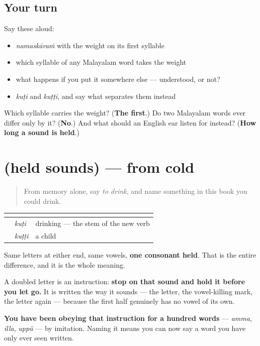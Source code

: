 \subsection*{Your turn}
Say these aloud:

\begin{itemize}
\raggedright
  \item \emph{namaskāraṁ} with the weight on its first syllable
  \item which syllable of any Malayalam word takes the weight
  \item what happens if you put it somewhere else — understood, or not?
  \item \emph{kuṭi} and \emph{kuṭṭi}, and say what separates them instead
\end{itemize}

\begin{tcolorbox}[breakable,colback=teal!4,colframe=teal!35!black,title={Before you move on}]
Which syllable carries the weight? (\textbf{The first}.) Do two Malayalam words ever differ only by it? (\textbf{No}.) And what should an English ear listen for instead? (\textbf{How long a sound is held}.)
\end{tcolorbox}
\section[(held sounds)]{(held sounds) — from cold}

\label{lesson:ML-R85-sounds-recall}



\begin{quote}
From memory alone, say \emph{to drink}, and name something in this book you could drink.
\end{quote}

\begin{grammarlens}[title={Grammar Lens: one held sound, one whole meaning}]
\noindent
\begin{tabularx}{\linewidth}{@{}>{\raggedright\arraybackslash}X>{\raggedright\arraybackslash}X>{\raggedright\arraybackslash}X@{}}
\toprule
\textbf{} & \textbf{} & \textbf{} \\
\midrule
\textbf{\ml{കുടി}} & \emph{kuṭi} & drinking — the stem of the new verb \\
\textbf{\ml{കുട്ടി}} & \emph{kuṭṭi} & a child \\
\bottomrule
\end{tabularx}

Same letters at either end, same vowels, \textbf{one consonant held}. That is the entire difference, and it is the whole meaning.

A doubled letter is an instruction: \textbf{stop on that sound and hold it before you let go.} It is written the way it sounds — the letter, the vowel-killing mark, the letter again — because the first half genuinely has no vowel of its own.

\textbf{You have been obeying that instruction for a hundred words} — \emph{amma}, \emph{illa}, \emph{uppŭ} — by imitation. Naming it means you can now say a word you have only ever seen written.
\end{grammarlens}

